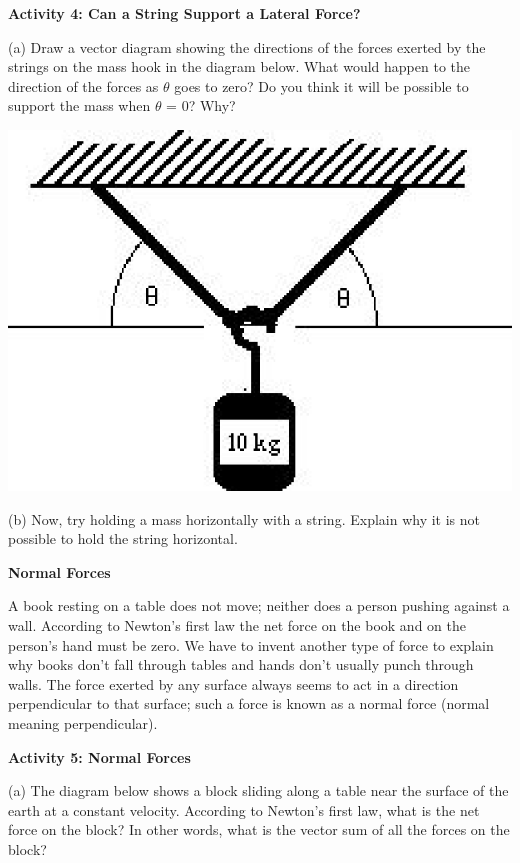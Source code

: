 \textbf{Activity 4: Can a String Support a Lateral Force?} 

(a) Draw a vector diagram showing the directions of the forces exerted by the
strings on the mass hook in the diagram below. What would happen to the direction
of the forces as \( \theta  \) goes to zero? Do you think it will be possible
to support the mass when \( \theta  \) = 0? Why?

\vspace{0.3cm}
{\par\raggedright \includegraphics{newton_fig8.eps} \par}
\vspace{0.3cm}

(b) Now, try holding a mass horizontally with a string. Explain why it is not possible to hold the string horizontal.
\vspace{20mm}

\textbf{Normal Forces} 

A book resting on a table does not move; neither does a person pushing against
a wall. According to Newton's first law the net force on the book and on the
person's hand must be zero. We have to invent another type of force
to explain why books don't fall through tables and hands don't usually punch
through walls. The force exerted by any surface always seems to act in a direction perpendicular to that surface; such a force is known as a normal force (normal meaning perpendicular).

\textbf{Activity 5: Normal Forces }

(a) The diagram below shows a block sliding along a table near the surface of
the earth at a constant velocity. According to Newton's first law, what is the
net force on the block? In other words, what is the vector sum of all the forces on the block?

